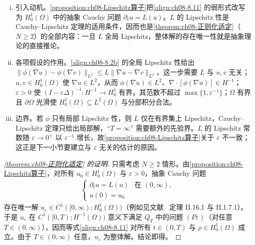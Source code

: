 \documentclass[../../main.tex]{subfiles}%
\begin{document}
\begin{remark}\label{remark:ch08-Lipschitz动机}
\begin{enumerate}[(i)]
\item 引入动机。\cref{proposition:ch08-Lipschitz算子}把\eqref{align:ch08-8.11} 的弱形式改写为 $H^1_0(\Omega)$ 中的抽象 Cauchy 问题 $\partial_tu=L(u)$。$L$ 的 Lipschitz 性是 Cauchy--Lipschitz 定理的适用条件，因而也是\cref{theorem:ch08-正则化适定}（$N\geqslant2$）的全部内容：一旦 $L$ 全局 Lipschitz，整体解的存在唯一性就是抽象理论的直接推论。
\item 各项假设的作用。\eqref{align:ch08-8.2b} 的全局 Lipschitz 性给出 $\|\phi(\nabla u)-\phi(\nabla v)\|_{L^2}\leqslant L\|\nabla u-\nabla v\|_{L^2}$，这一步需要 $L$ 与 $u,v$ 无关；$u,v\in H^1_0(\Omega)$ 使 $\nabla u\in L^2$，从而 $\phi(\nabla u)\in L^2$、$\nabla\cdot[\phi(\nabla u)]\in H^{-1}$；$\varepsilon>0$ 使 $(I-\varepsilon\Delta)^{-1}:H^{-1}\to H^1_0$ 有界，其范数不超过 $\max\{1,\varepsilon^{-1}\}$；$\Omega$ 有界且 $\partial\Omega$ 光滑使 $H^1_0(\Omega)\subseteq L^2(\Omega)$ 与分部积分合法。
\item 边界。若 $\phi$ 只有局部 Lipschitz 性，则 $L$ 仅在有界集上 Lipschitz，Cauchy--Lipschitz 定理只给出局部解，“$T=\infty$” 需要额外的先验界。$L$ 的 Lipschitz 常数随 $\varepsilon\to0^+$ 以 $\varepsilon^{-1}$ 增长，故\cref{proposition:ch08-Lipschitz算子}关于 $\varepsilon$ 不一致；这正是下一小节要建立与 $\varepsilon$ 无关的估计的原因。
\end{enumerate}
\end{remark}

\begin{proof}[\cref{theorem:ch08-正则化适定} 的证明]
只需考虑 $N\geqslant2$ 情形。由\cref{proposition:ch08-Lipschitz算子}，对所有 $u_0\in H^1_0(\Omega)$ 与 $\varepsilon>0$，抽象 Cauchy 问题
\begin{align}\label{align:ch08-8.20}
\begin{cases}
\partial_t u=L(u) & \text{在 }(0,\infty),\\
u(0)=u_0
\end{cases}
\end{align}
存在唯一解 $u_\varepsilon\in C^1([0,\infty);H^1_0(\Omega))$（例如见文献~\cite{ref31} 定理 II.16.1 与 II.1.7.1）。于是 $u_\varepsilon$ 在 $C^1([0,T);H^{-1}(\Omega))$ 意义下满足 $Q_T$ 中的问题 $(P\varepsilon)$（对任意 $T\in(0,\infty)$），因而等式\eqref{align:ch08-8.11} 对所有 $t\in(0,T)$ 与 $\rho\in H^1_0(\Omega)$ 成立。由于 $T\in(0,\infty)$ 任意，$u_\varepsilon$ 为整体解。结论即得。
\end{proof}
\end{document}
